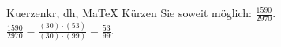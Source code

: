\begin{MAufgabe}{Kuerzen}{kr, dh, MaTeX}
K\"urzen Sie soweit m\"oglich: $\frac{1590}{2970}$.\\ 
\ifLsg\MLoesung
\quad $\frac{1590}{2970}=\frac{(30)\cdot(53)}{(30)\cdot(99)}=\frac{53}{99}$.\else\relax\fi
 \end{MAufgabe}